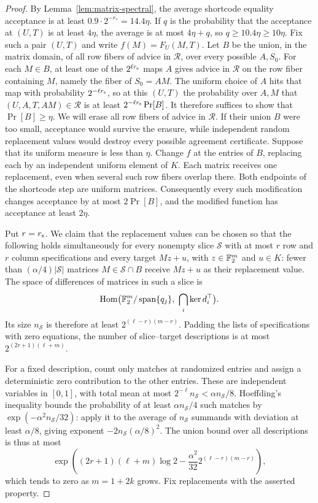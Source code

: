 \begin{proof}
By Lemma~\ref{lem:matrix-spectral}, the average shortcode equality acceptance
is at least $0.9\cdot2^{-r_*}=14.4\eta$.  If $q$ is the probability that
the acceptance at $(U,T)$ is at least $4\eta$, the average is at most
$4\eta+q$, so $q\ge10.4\eta\ge10\eta$.
Fix such a pair $(U,T)$ and write $f(M)=F_U(M,T)$.
Let $B$ be the union, in the matrix domain, of all
row fibers of advice in $\mathcal R$, over every possible $A,S_0$.  For each $M\in B$, at
least one of the $2^{\ell r_{\rm s}}$ maps $A$ gives advice in $\mathcal R$ on the row fiber
containing $M$, namely the fiber of $S_0=AM$.  The uniform choice of
$A$ hits that map with probability $2^{-\ell r_{\rm s}}$, so at this
$(U,T)$ the probability over $A,M$ that $(U,A,T,AM)\in\mathcal R$ is at least
$2^{-\ell r_{\rm s}}\Pr[B]$.  It therefore suffices to show that
$\Pr[B]\ge\eta$.
We will erase all row fibers of advice in $\mathcal R$.  If their union $B$ were too small,
acceptance would survive the erasure, while independent random
replacement values would destroy every possible agreement certificate.
Suppose that its uniform measure is less than $\eta$.  Change $f$ at the entries of $B$, replacing
each by an independent uniform element of $K$.  Each matrix receives one
replacement, even when several such row fibers overlap there.  Both endpoints of the
shortcode step are uniform matrices.  Consequently every such modification
changes acceptance by at most $2\Pr[B]$, and the modified function has
acceptance at least $2\eta$.

Put $r=r_{\rm s}$.  We claim that the replacement values can be chosen
so that the following holds simultaneously for every nonempty slice
$\mathcal S$ with at most $r$ row and $r$ column specifications and
every target $Mz+u$, with $z\in\mathbb F_2^m$ and $u\in K$: fewer than
$(\alpha/4)|\mathcal S|$ matrices $M\in\mathcal S\cap B$ receive
$Mz+u$ as their replacement value.  The space of differences of matrices in such a slice is
\[
 \Hom\bigl(\F_2^m/\Span\{q_j\},\ \bigcap_i\ker d_i^\top\bigr).
\]
Its size $n_{\mathcal S}$ is therefore at least
$2^{(\ell-r)(m-r)}$.  Padding the lists of specifications with zero
equations, the number of slice--target descriptions is at most
$2^{(2r+1)(\ell+m)}$.

For a fixed description, count only matches at randomized entries and
assign a deterministic zero contribution to the other entries.  These are
independent variables in $[0,1]$, with total mean at most
$2^{-\ell}n_{\mathcal S}<\alpha n_{\mathcal S}/8$.  Hoeffding's
inequality \cite[Theorem~2, equation~(2.6)]{Hoeffding1963} bounds the
probability of at least
$\alpha n_{\mathcal S}/4$ such matches by
$\exp(-\alpha^2 n_{\mathcal S}/32)$: apply it to the average of
$n_{\mathcal S}$ summands with deviation at least $\alpha/8$,
giving exponent $-2n_{\mathcal S}(\alpha/8)^2$.
The union bound over all
descriptions is thus at most
\[
 \exp\left((2r+1)(\ell+m)\log2
       -\frac{\alpha^2}{32}2^{(\ell-r)(m-r)}\right),
\]
which tends to zero as $m=1+2k$ grows.  Fix replacements with the asserted
property.


\end{proof}
